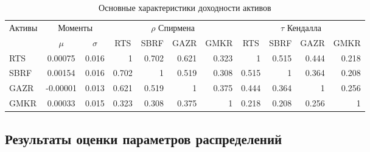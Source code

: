 \begin{table}[ht]
    \centering
    \caption{Основные характеристики доходности активов}
    \label{tab:assets}
    \setlength{\tabcolsep}{5pt}
    \begin{adjustbox}{max width=\textwidth}
    \begin{tabular}{l|cc|rrrr|rrrr}
        \hline
        \multirow{2}{*}{Активы} & \multicolumn{2}{c|}{Моменты} & \multicolumn{4}{c|}{$\rho$ Спирмена} & \multicolumn{4}{c}{$\tau$ Кендалла} \\
        & $\mu$ & $\sigma$ & \multicolumn{1}{c}{RTS} & \multicolumn{1}{c}{SBRF} & \multicolumn{1}{c}{GAZR} & \multicolumn{1}{c|}{GMKR} & \multicolumn{1}{c}{RTS} & \multicolumn{1}{c}{SBRF} & \multicolumn{1}{c}{GAZR} & \multicolumn{1}{c}{GMKR} \\ \hline
RTS  &  0.00075 & 0.016 &     1 & 0.702 & 0.621 & 0.323 &     1 & 0.515 & 0.444 & 0.218 \\
SBRF &  0.00154 & 0.016 & 0.702 &     1 & 0.519 & 0.308 & 0.515 &     1 & 0.364 & 0.208 \\
GAZR & -0.00001 & 0.013 & 0.621 & 0.519 &     1 & 0.375 & 0.444 & 0.364 &     1 & 0.256 \\
GMKR &  0.00033 & 0.015 & 0.323 & 0.308 & 0.375 &     1 & 0.218 & 0.208 & 0.256 &     1 \\ \hline
    \end{tabular}
    \end{adjustbox}
\end{table}


\subsection{Результаты оценки параметров распределений}
\label{calibration:marginals}

